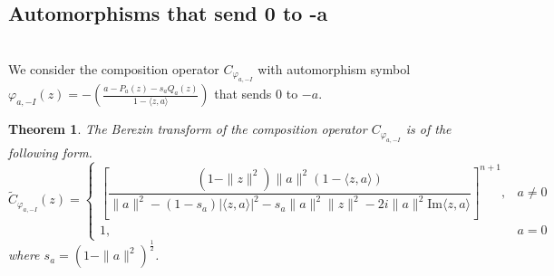 \documentclass{amsart}
\newtheorem{theorem}{Theorem}
\theoremstyle{remark}
\begin{document}
\subsection{Automorphisms that send 0 to -a}  \mbox{} \\
We consider the composition operator $C_{\varphi_{a,-I}}$ with automorphism symbol $\varphi_{a,-I}(z)= -\left(\frac{a-P_a(z)-s_aQ_a(z)}{1-\langle z,a\rangle}\right)$ that sends $0$ to $-a$.
\begin{theorem}\label{Th: Blaschke type symbol 0 to -a}
    The Berezin transform of the composition operator $C_{\varphi_{a,-I}}$ is of the following form.
    \begin{equation*}
        \widetilde{C}_{\varphi_{a,-I}}(z) =
        \begin{cases}
            \left[\dfrac{(1 - \|z\|^{2})\|a\|^{2}(1 - \langle z,a \rangle)}{\|a\|^{2} - (1-s_a)|\langle z,a \rangle|^2 - s_{a}\|a\|^2\|z\|^2-2i\|a\|^{2}\mathrm{Im}\langle z,a \rangle}\right]^{n+1}, & a \neq 0 \\
            1, & a = 0
        \end{cases}
    \end{equation*}
    where $s_{a} = (1 - \|a\|^{2})^{\frac{1}{2}}$.
\end{theorem}
\end{document}
